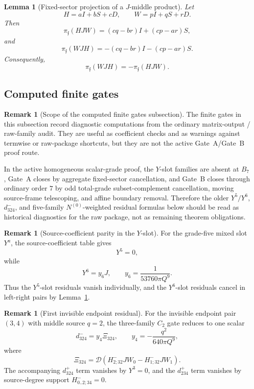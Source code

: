 \documentclass[11pt,a4paper]{amsart}
\theoremstyle{plain}
\newtheorem{lemma}[theorem]{Lemma}
\theoremstyle{definition}
\newtheorem{remark}[theorem]{Remark}
\begin{document}
\begin{lemma}[Fixed-sector projection of a \(J\)-middle product]
\label{lem:fixed-sector-projection-j-middle-product}
Let
\[
H=aI+bS+cD,\qquad W=pI+qS+rD.
\]
Then
\[
\pi_{\mathfrak f}(HJW)
=
(cq-br)I+(cp-ar)S,
\]
and
\[
\pi_{\mathfrak f}(WJH)
=
-(cq-br)I-(cp-ar)S.
\]
Consequently,
\[
\pi_{\mathfrak f}(WJH)=-\pi_{\mathfrak f}(HJW).
\]
\end{lemma}

\subsection{Computed finite gates}
\label{subsec:computed-finite-gates}

\begin{remark}[Scope of the computed finite gates subsection]
\label{rem:scope-computed-finite-gates-subsection}
The finite gates in this subsection record diagnostic computations from
the ordinary matrix-output / raw-family audit.  They are useful as
coefficient checks and as warnings against termwise or raw-package
shortcuts, but they are not the active Gate~A/Gate~B proof route.

In the active homogeneous scalar-grade proof, the \(Y\)-slot families
are absent at \(B_7\), Gate~A closes by aggregate fixed-sector
cancellation, and Gate~B closes through ordinary order \(7\) by odd
total-grade subset-complement cancellation, moving source-frame
telescoping, and affine boundary removal.  Therefore the older
\(Y^5/Y^6\), \(d^-_{324}\), and five-family \(N^{(0)}\)-weighted
residual formulas below should be read as historical diagnostics for
the raw package, not as remaining theorem obligations.
\end{remark}

\begin{remark}[Source-coefficient parity in the \(Y\)-slot]
\label{rem:y-slot-source-coefficient-parity}
For the grade-five mixed slot \(Y^a\), the source-coefficient table gives
\[
Y^5=0,
\]
while
\[
Y^6=y_6J,\qquad y_6=\frac{1}{53760\pi Q^9}.
\]
Thus the \(Y^5\)-slot residuals vanish individually, and the \(Y^6\)-slot
residuals cancel in left-right pairs by
Lemma~\ref{lem:fixed-sector-projection-j-middle-product}.
\end{remark}

\begin{remark}[First invisible endpoint residual]
\label{rem:first-invisible-endpoint-residual}
For the invisible endpoint pair \((3,4)\) with middle source \(q=2\), the
three-family \(C_2\) gate reduces to one scalar
\[
d^-_{324}
=
y_4\Xi_{324},
\qquad
y_4=-\frac{q^2}{640\pi Q^9},
\]
where
\[
\Xi_{324}
=
\mathcal D(H^-_{2;32}JW_0-H^-_{1;32}JW_1).
\]
The accompanying \(d^+_{324}\) term vanishes by \(Y^3=0\), and the
\(d^+_{234}\) term vanishes by source-degree support
\(H^-_{0..2;34}=0\).
\end{remark}
\end{document}
